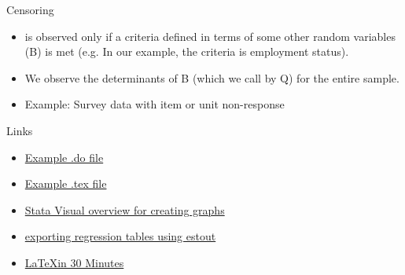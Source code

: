 \documentclass{beamer}
\begin{document}
\begin{frame}{Censoring}
\begin{itemize}
\item is observed only if a criteria defined in terms of some other random
 variables (B) is met (e.g. In our example, the criteria is employment status).
\item We observe the determinants of B (which we call by Q) for the entire 
sample.
\item Example: Survey data with item or unit non-response
\end{itemize}
\end{frame}


\begin{frame}{Links}

\begin{itemize}
\item \href{https://github.com/mhdsh1/are256b-w24/blob/main/example.do}
{Example .do file} 
\item \href{https://github.com/mhdsh1/are256b-w24/blob/main/example.tex}
{Example .tex file}
\item \href{https://www.stata.com/support/faqs/graphics/gph/stata-graphs/}
{Stata Visual overview for creating graphs}
\item \href{https://repec.sowi.unibe.ch/stata/estout/index.html}
{exporting regression tables using estout}
\item \href{https://www.overleaf.com/learn/latex/Learn_LaTeX_in_30_minutes}
{\LaTeX in 30 Minutes}
\end{itemize}

\end{frame}
\end{document}
